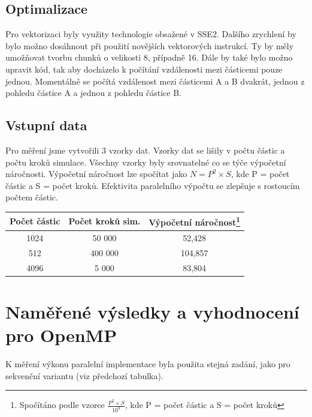 \documentclass[12pt]{article}
\begin{document}
\subsection{Optimalizace}

Pro vektorizaci byly využity technologie obsažené v SSE2. Dalšího zrychlení by bylo možno dosáhnout při použití novějších vektorových instrukcí.
Ty by měly umožňovat tvorbu chunků o velikosti 8, případně 16.
Dále by také bylo možno upravit kód, tak aby docházelo k počítání vzdálenosti mezi částicemi pouze jednou.
Momentálně se počítá vzdálenost mezi částicemi A a B dvakrát, jednou z pohledu částice A a jednou z pohledu částice B.

\subsection{Vstupní data}
Pro měření jsme vytvořili 3 vzorky dat. Vzorky dat se lišily v počtu částic a počtu kroků simulace.
Všechny vzorky byly srovnatelné co se týče výpočetní náročnosti. Výpočetní náročnost lze spočítat jako ${N = P^2 \times S}$, kde P = počet částic a S = počet kroků.
Efektivita paralelního výpočtu se zlepšuje s rostoucím počtem částic.

\begin{center}
\begin{tabular}{c | c | c }
\textbf{Počet částic} & \textbf{Počet kroků sim.}  & \textbf{Výpočetní náročnost}\footnote{Spočítáno podle vzorce ${\frac{P^2 \times S}{10^9}}$, kde P = počet částic a S = počet kroků} \\ \hline \hline
1024 & 50 000 & 52,428 \\ \hline
512 & 400 000 & 104,857 \\ \hline
4096 & 5 000 & 83,804 \\ \hline
\end{tabular}
\end{center}

\section{Naměřené výsledky a vyhod\-noce\-ní pro O\-pen\-MP}
K měření výkonu paralelní implementace byla použita stejná zadání, jako pro sekvenční variantu (viz předchozí tabulka).
\end{document}
